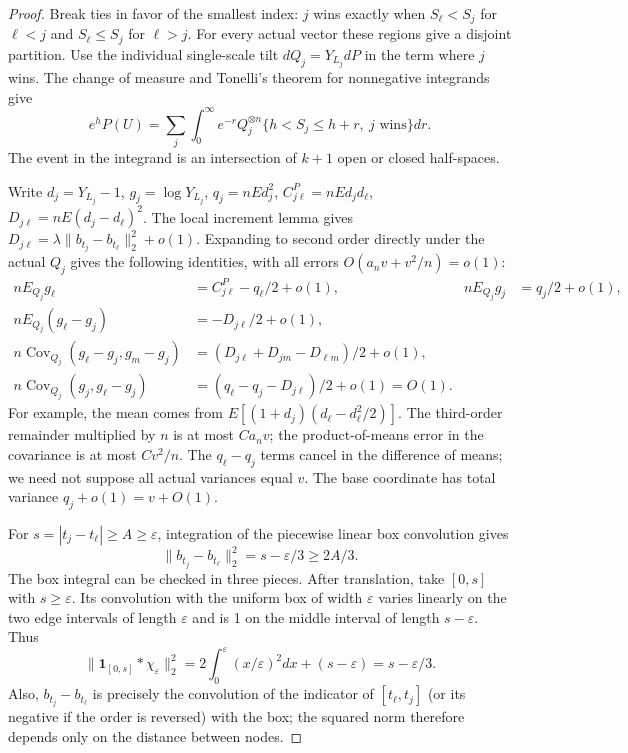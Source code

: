 \documentclass[a4paper,11pt]{article}
\theoremstyle{remark}
\begin{document}
\begin{proof}
Break ties in favor of the smallest index: $j$ wins exactly when
$S_\ell<S_j$ for $\ell<j$ and $S_\ell\le S_j$ for $\ell>j$.
For every actual vector these regions give a disjoint partition.
Use the individual single-scale tilt $dQ_j=Y_{L_j}dP$ in the term where $j$ wins.
The change of measure and Tonelli's theorem for nonnegative integrands give
\begin{equation}\label{eq:paperwinneridentity}
 e^hP(U)=\sum_j\int_0^\infty e^{-r}
 Q_j^{\otimes n}\{h<S_j\le h+r,\ j\text{ wins}\}dr.
\end{equation}
The event in the integrand is an intersection of $k+1$ open or closed half-spaces.

Write $d_j=Y_{L_j}-1$, $g_j=\log Y_{L_j}$,
$q_j=nEd_j^2$, $C^P_{j\ell}=nEd_jd_\ell$,
$D_{j\ell}=nE(d_j-d_\ell)^2$.
The local increment lemma gives $D_{j\ell}=\lambda\|b_{t_j}-b_{t_\ell}\|_2^2+o(1)$.
Expanding to second order directly under the actual $Q_j$ gives the following identities, with all errors $O(a_nv+v^2/n)=o(1)$:
\begin{align*}
 nE_{Q_j}g_\ell&=C^P_{j\ell}-q_\ell/2+o(1),&nE_{Q_j}g_j&=q_j/2+o(1),\\
 nE_{Q_j}(g_\ell-g_j)&=-D_{j\ell}/2+o(1),\\
 n\operatorname{Cov}_{Q_j}(g_\ell-g_j,g_m-g_j)
 &=(D_{j\ell}+D_{jm}-D_{\ell m})/2+o(1),\\
 n\operatorname{Cov}_{Q_j}(g_j,g_\ell-g_j)
 &=(q_\ell-q_j-D_{j\ell})/2+o(1)=O(1).
\end{align*}
For example, the mean comes from $E[(1+d_j)(d_\ell-d_\ell^2/2)]$.
The third-order remainder multiplied by $n$ is at most $Ca_nv$; the product-of-means error in the covariance is at most $Cv^2/n$.
The $q_\ell-q_j$ terms cancel in the difference of means; we need not suppose all actual variances equal $v$.
The base coordinate has total variance $q_j+o(1)=v+O(1)$.

For $s=|t_j-t_\ell|\ge A\ge\varepsilon$, integration of the piecewise linear box convolution gives
\[
 \|b_{t_j}-b_{t_\ell}\|_2^2=s-\varepsilon/3\ge2A/3.
\]
The box integral can be checked in three pieces. After translation, take $[0,s]$ with $s\ge\varepsilon$.
Its convolution with the uniform box of width $\varepsilon$ varies linearly on the two edge intervals of length $\varepsilon$
and is 1 on the middle interval of length $s-\varepsilon$. Thus
\[
 \|\mathbf1_{[0,s]}*\chi_\varepsilon\|_2^2
 =2\int_0^\varepsilon(x/\varepsilon)^2dx+(s-\varepsilon)
 =s-\varepsilon/3.
\]
Also, $b_{t_j}-b_{t_\ell}$ is precisely the convolution of the indicator of $[t_\ell,t_j]$ (or its negative if the order is reversed) with the box;
the squared norm therefore depends only on the distance between nodes.


\end{proof}
\end{document}
